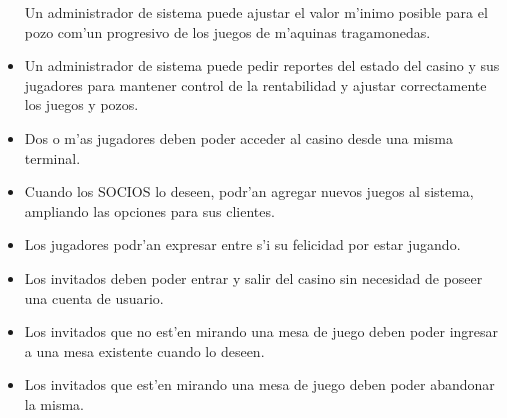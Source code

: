 \begin{itemize}
 Un administrador de sistema puede ajustar el valor m'inimo posible para el pozo com'un progresivo de los juegos de m'aquinas tragamonedas.

\item {} 

 Un administrador de sistema puede pedir reportes del estado del casino y sus jugadores para mantener control de la rentabilidad y ajustar correctamente los juegos y pozos.

\item {} 

 Dos o m'as jugadores deben poder acceder al casino desde una misma terminal.

\item {} 

 Cuando los SOCIOS lo deseen, podr'an agregar nuevos juegos al sistema, ampliando las opciones para sus clientes.

\end{itemize}

\clearpage


\begin{itemize}

\item {} 

 Los jugadores podr'an expresar entre s'i su felicidad por estar jugando.

\item {} 

 Los invitados deben poder entrar y salir del casino sin necesidad de poseer una cuenta de usuario.

\item {} 

 Los invitados que no est'en mirando una mesa de juego deben poder ingresar a una mesa existente cuando lo deseen.

\item {} 

 Los invitados que est'en mirando una mesa de juego deben poder abandonar la misma.

\end{itemize}




